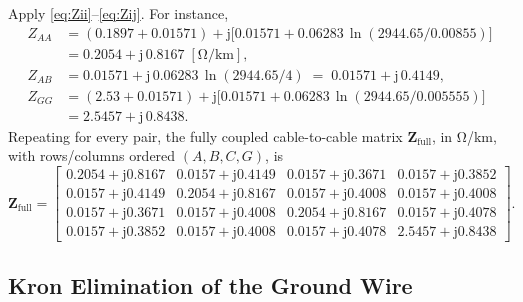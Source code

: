 \documentclass[11pt,a4paper]{article}
\newcommand{\jj}{\mathrm{j}}
\newcommand{\matZ}{\bm{Z}}
\begin{document}
Apply \eqref{eq:Zii}--\eqref{eq:Zij}. For instance,
\begin{align*}
Z_{AA} &= (0.1897 + 0.01571) + \jj\bigl[0.01571 + 0.06283\,\ln(2944.65/0.00855)\bigr]\\
       &= 0.2054 + \jj\,0.8167 \;[\si{\ohm/\kilo\metre}],\\[3pt]
Z_{AB} &= 0.01571 + \jj\,0.06283\,\ln(2944.65/4) \;=\; 0.01571 + \jj\,0.4149,\\
Z_{GG} &= (2.53 + 0.01571) + \jj\bigl[0.01571 + 0.06283\,\ln(2944.65/0.005555)\bigr]\\
       &= 2.5457 + \jj\,0.8438.
\end{align*}
Repeating for every pair, the fully coupled cable-to-cable matrix
\(\matZ_{\mathrm{full}}\), in \si{\ohm/\kilo\metre}, with rows/columns ordered
\((A,B,C,G)\), is
\begin{equation*}
\matZ_{\mathrm{full}}=
\begin{bmatrix}
0.2054{+}\jj 0.8167 & 0.0157{+}\jj 0.4149 & 0.0157{+}\jj 0.3671 & 0.0157{+}\jj 0.3852\\
0.0157{+}\jj 0.4149 & 0.2054{+}\jj 0.8167 & 0.0157{+}\jj 0.4008 & 0.0157{+}\jj 0.4008\\
0.0157{+}\jj 0.3671 & 0.0157{+}\jj 0.4008 & 0.2054{+}\jj 0.8167 & 0.0157{+}\jj 0.4078\\
0.0157{+}\jj 0.3852 & 0.0157{+}\jj 0.4008 & 0.0157{+}\jj 0.4078 & 2.5457{+}\jj 0.8438
\end{bmatrix}.
\end{equation*}

\subsection{Kron Elimination of the Ground Wire}
\end{document}
